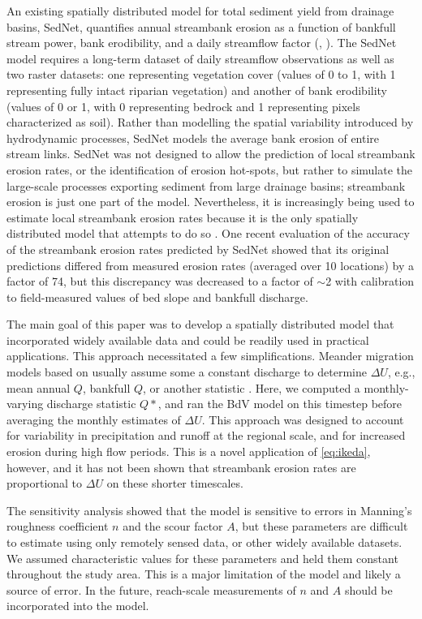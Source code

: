 \documentclass[preprint, review, authoryear, 12pt]{elsarticle}
\begin{document}
An existing spatially distributed model for total sediment yield from drainage basins, SedNet, quantifies annual streambank erosion as a function of bankfull stream power, bank erodibility, and a daily streamflow factor (\citealp{Wilkinson2009}, \citeyear{Wilkinson2014}). The SedNet model requires a long-term dataset of daily streamflow observations as well as two raster datasets: one representing vegetation cover (values of 0 to 1, with 1 representing fully intact riparian vegetation) and another of bank erodibility (values of 0 or 1, with 0 representing bedrock and 1 representing pixels characterized as soil). Rather than modelling the spatial variability introduced by hydrodynamic processes, SedNet models the average bank erosion of entire stream links. SedNet was not designed to allow the prediction of local streambank erosion rates, or the identification of erosion hot-spots, but rather to simulate the large-scale processes exporting sediment from large drainage basins; streambank erosion is just one part of the model. Nevertheless, it is increasingly being used to estimate local streambank erosion rates because it is the only spatially distributed model that attempts to do so \citep{Bartley2008}. One recent evaluation of the accuracy of the streambank erosion rates predicted by SedNet showed that its original predictions differed from measured erosion rates (averaged over 10 locations) by a factor of 74, but this discrepancy was decreased to a factor of $\sim$2 with calibration to field-measured values of bed slope and bankfull discharge.

The main goal of this paper was to develop a spatially distributed model that incorporated widely available data and could be readily used in practical applications. This approach necessitated a few simplifications. Meander migration models based on  usually assume some a constant discharge to determine $\Delta U$, e.g., mean annual $Q$, bankfull $Q$, or another statistic \citep{Camporeale2010}. Here, we computed a monthly-varying discharge statistic $Q*$, and ran the BdV model on this timestep before averaging the monthly estimates of $\Delta U$. This approach was designed to account for variability in precipitation and runoff at the regional scale, and for increased erosion during high flow periods. This is a novel application of \cref{eq:ikeda}, however, and it has not been shown that streambank erosion rates are proportional to $\Delta U$ on these shorter timescales.

The sensitivity analysis showed that the model is sensitive to errors in Manning's roughness coefficient $n$ and the scour factor $A$, but these parameters are difficult to estimate using only remotely sensed data, or other widely available datasets. We assumed characteristic values for these parameters and held them constant throughout the study area. This is a major limitation of the model and likely a source of error. In the future, reach-scale measurements of $n$ and $A$ should be incorporated into the model.
\end{document}
